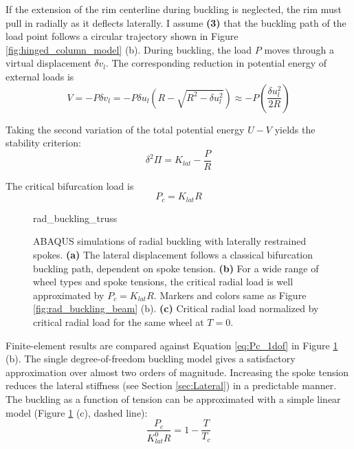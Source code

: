\documentclass[\rootdir/thesis.tex]{subfiles}
\begin{document}
If the extension of the rim centerline during buckling is neglected, the rim must pull in radially as it deflects laterally. I assume \textbf{(3)} that the buckling path of the load point follows a circular trajectory shown in Figure \ref{fig:hinged_column_model} (b). During buckling, the load $P$ moves through a virtual displacement $\delta v_l$. The corresponding reduction in potential energy of external loads is
\begin{equation}
\label{eq:V_rim_1dof}
V = -P\delta v_l = -P \delta u_l \left(R - \sqrt{R^2 - \delta u_l^2}\right)
\approx -P \left(\frac{\delta u_l^2}{2R}\right)
\end{equation}

Taking the second variation of the total potential energy $U-V$ yields the stability criterion:
\begin{equation}
\label{eq:ddPi_1dof}
\delta^2 \Pi = K_{lat} - \frac{P}{R}
\end{equation}

The critical bifurcation load is
\begin{equation}
\label{eq:Pc_1dof}
P_c = K_{lat}R
\end{equation}

\begin{figure}[h]
\centering
{rad_buckling_truss} 
\caption{ABAQUS simulations of radial buckling with laterally restrained spokes. \textbf{(a)} The lateral displacement follows a classical bifurcation buckling path, dependent on spoke tension. \textbf{(b)} For a wide range of wheel types and spoke tensions, the critical radial load is well approximated by $P_c = K_{lat}R$. Markers and colors same as Figure \ref{fig:rad_buckling_beam} (b). \textbf{(c)} Critical radial load normalized by critical radial load for the same wheel at $T=0$.}
\label{fig:rad_buckling_truss}
\end{figure}

Finite-element results are compared against Equation \eqref{eq:Pc_1dof} in Figure \ref{fig:rad_buckling_truss} (b). The single degree-of-freedom buckling model gives a satisfactory approximation over almost two orders of magnitude. Increasing the spoke tension reduces the lateral stiffness (see Section \ref{sec:Lateral}) in a predictable manner. The buckling as a function of tension can be approximated with a simple linear model (Figure \ref{fig:rad_buckling_truss} (c), dashed line):
\begin{equation}
\label{eq:P_c_T}
\frac{P_c}{K_{lat}^0 R} = 1 - \frac{T}{T_c}
\end{equation}
\end{document}
